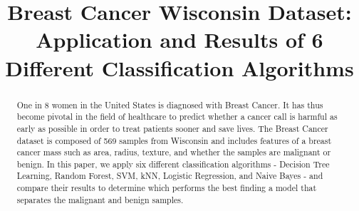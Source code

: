 \documentclass[conference]{IEEEtran}
\begin{document}
\title{Breast Cancer Wisconsin Dataset:\\ 
Application and Results of 6 Different Classification Algorithms}

\author{
\and
{}
\and
{}
}

\maketitle


\begin{abstract}
One in 8 women in the United States is diagnosed with Breast Cancer. It has thus become pivotal in the field of healthcare to predict whether a cancer call is harmful as early as possible in order to treat patients sooner and save lives. The Breast Cancer dataset is composed of 569 samples from Wisconsin and includes features of a breast cancer mass such as area, radius, texture, and whether the samples are malignant or benign. In this paper, we apply six different classification algorithms - Decision Tree Learning, Random Forest, SVM, kNN, Logistic Regression, and Naive Bayes - and compare their results to determine which performs the best finding a model that separates the malignant and benign samples.
\end{abstract}
\end{document}
